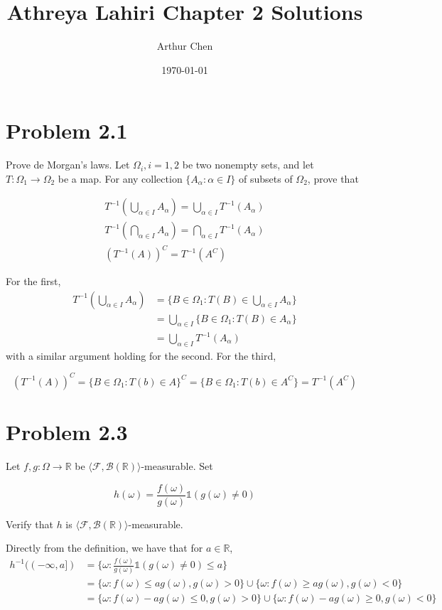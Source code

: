 \documentclass{article}
\author{Arthur Chen}
\title{Athreya Lahiri Chapter 2 Solutions}
\date{\today}
\newcommand{\R}{\mathbb{R}}
\newcommand{\F}{\mathcal{F}}
\newcommand{\B}{\mathcal{B}}
\begin{document}
\maketitle

\section*{Problem 2.1}

Prove de Morgan's laws. Let $\Omega_i, i = 1, 2$ be two nonempty sets, and let $T:\Omega_1 \rightarrow \Omega_2$ be a map. For any collection $\{A_\alpha: \alpha \in I\}$ of subsets of $\Omega_2$, prove that

\begin{gather*}
T^{-1}\left( \bigcup_{\alpha \in I} A_\alpha \right) = \bigcup_{\alpha \in I} T^{-1}(A_\alpha) \\
T^{-1}\left( \bigcap_{\alpha \in I} A_\alpha \right) = \bigcap_{\alpha \in I} T^{-1}(A_\alpha) \\
\left( T^{-1}(A) \right)^C = T^{-1}(A^C)
\end{gather*}

For the first,
\begin{align*}
T^{-1}\left( \bigcup_{\alpha \in I} A_\alpha \right) &= \{ B \in \Omega_1: T(B) \in \bigcup_{\alpha \in I} A_\alpha \} \\
&=\bigcup_{\alpha \in I} \{ B \in \Omega_1: T(B) \in  A_\alpha \} \\
&= \bigcup_{\alpha \in I} T^{-1}(A_\alpha)
\end{align*}
with a similar argument holding for the second. For the third,

\[
\left( T^{-1}(A) \right)^C = \{B \in \Omega_1: T(b) \in A\}^C = \{B \in \Omega_1: T(b) \in A^C\} = T^{-1}(A^C)
\]

\section*{Problem 2.3}

Let $f, g: \Omega \rightarrow \R$ be $\langle \F, \B(\R) \rangle$-measurable. Set

\[
h(\omega) = \frac{f(\omega)}{g(\omega)}\mathds{1}(g(\omega) \neq 0)
\]

Verify that $h$ is $\langle \F, \B(\R) \rangle$-measurable.

Directly from the definition, we have that for $a \in \R$,
\begin{align*}
h^{-1}((-\infty, a]) &= \{\omega: \frac{f(\omega)}{g(\omega)}\mathds{1}(g(\omega) \neq 0) \leq a \} \\
&= \{\omega: f(\omega) \leq ag(\omega), g(\omega) > 0 \} \cup \{\omega: f(\omega) \geq ag(\omega), g(\omega) < 0 \} \\
&= \{\omega: f(\omega) - ag(\omega) \leq 0, g(\omega) > 0 \} \cup \{\omega: f(\omega) - ag(\omega) \geq 0, g(\omega) < 0 \}
\end{align*}
\end{document}
